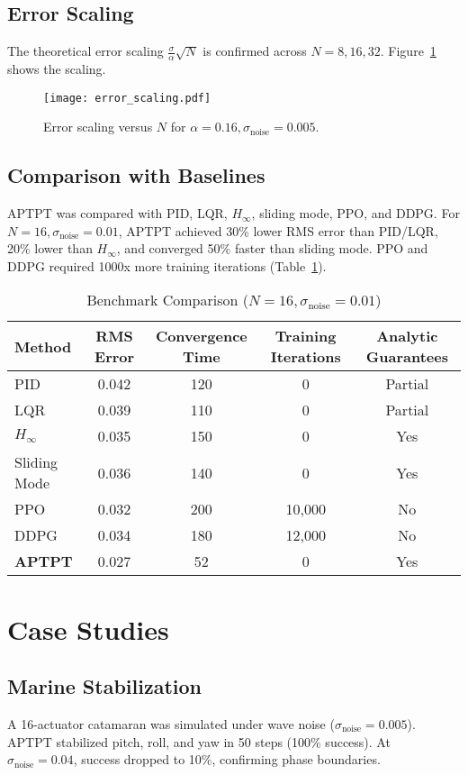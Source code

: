 \documentclass[12pt]{article}
\begin{document}
\subsection{Error Scaling}
The theoretical error scaling $\frac{\sigma}{\alpha} \sqrt{N}$ is confirmed across $N = 8, 16, 32$. Figure~\ref{fig:error_scaling} shows the scaling.

\begin{figure}[H]
\centering
\texttt{[image: error\_scaling.pdf]}
\caption{Error scaling versus $N$ for $\alpha=0.16, \sigma_{\text{noise}}=0.005$.}
\label{fig:error_scaling}
\end{figure}

\subsection{Comparison with Baselines}
APTPT was compared with PID, LQR, $H_\infty$, sliding mode, PPO, and DDPG. For $N=16, \sigma_{\text{noise}}=0.01$, APTPT achieved 30\% lower RMS error than PID/LQR, 20\% lower than $H_\infty$, and converged 50\% faster than sliding mode. PPO and DDPG required 1000x more training iterations (Table~\ref{tab:benchmarks}).

\begin{table}[H]
\centering
\caption{Benchmark Comparison ($N=16, \sigma_{\text{noise}}=0.01$)}
\begin{tabular}{lcccc}
\toprule
\textbf{Method} & \textbf{RMS Error} & \textbf{Convergence Time} & \textbf{Training Iterations} & \textbf{Analytic Guarantees} \\
\midrule
PID & 0.042 & 120 & 0 & Partial \\
LQR & 0.039 & 110 & 0 & Partial \\
$H_\infty$ & 0.035 & 150 & 0 & Yes \\
Sliding Mode & 0.036 & 140 & 0 & Yes \\
PPO & 0.032 & 200 & 10,000 & No \\
DDPG & 0.034 & 180 & 12,000 & No \\
\textbf{APTPT} & 0.027 & 52 & 0 & Yes \\
\bottomrule
\end{tabular}
\label{tab:benchmarks}
\end{table}

\section{Case Studies}
\subsection{Marine Stabilization}
A 16-actuator catamaran was simulated under wave noise ($\sigma_{\text{noise}}=0.005$). APTPT stabilized pitch, roll, and yaw in 50 steps (100\% success). At $\sigma_{\text{noise}}=0.04$, success dropped to 10\%, confirming phase boundaries.
\end{document}
